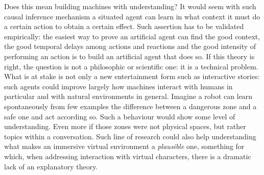 \documentclass[
		twoside,openright,titlepage,numbers=noenddot,manychapters,
		headinclude,%
                footinclude=false,cleardoublepage=empty,
                BCOR=5mm,
		fontsize=11pt, %
                 enabledeprecatedfontcommands]{scrreprt}
\begin{document}
Does this mean building machines with understanding? It would seem with such causal inference mechanism a situated agent can learn in what context it must do a certain action to obtain a certain effect. %
Such assertion has to be validated empirically: the easiest way to prove an artificial agent can find the good context, the good temporal delays among actions and reactions and the good intensity of performing an action is to build an artificial agent that does so. If this theory is right, the question is not a philosophic or scientific one: it is a technical problem.
What is at stake is not only a new entertainment form such as interactive stories: such agents could improve largely how machines interact with humans in particular and with natural environments in general.  Imagine a robot can learn spontaneously from few examples the difference between a dangerous zone and a safe one and act according so. Such a behaviour would show some level of understanding. Even more if those zones were not physical spaces, but rather topics within a conversation.  
Such line of research could also help understanding what makes an immersive virtual environment a \emph{plausible} one, something for which, when addressing interaction with virtual characters, there is a dramatic lack of an explanatory theory. %
\end{document}
